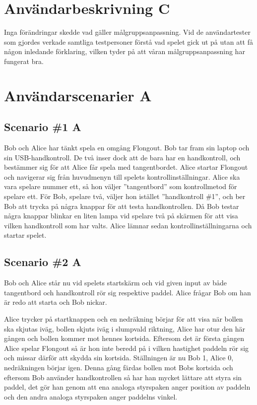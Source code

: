 \documentclass[a4paper,11pt]{article}
\begin{document}
\section{Användarbeskrivning C}
Inga förändringar skedde vad gäller målgruppsanpassning. Vid de användartester som gjordes verkade
samtliga testpersoner förstå vad spelet gick ut på utan att få någon inledande förklaring, vilken
tyder på att våran målgruppsanpassning har fungerat bra.

\section{Användarscenarier A}
\subsection{Scenario \#1 A}
Bob och Alice har tänkt spela en omgång Flongout. Bob tar fram sin laptop
och sin USB-handkontroll. De två inser dock att de bara har en handkontroll,
och bestämmer sig för att Alice får spela med tangentbordet. Alice startar
Flongout och navigerar sig från huvudmenyn till spelets kontrollinställningar.
Alice ska vara spelare nummer ett, så hon väljer ''tangentbord'' som kontrollmetod
för spelare ett. För Bob, spelare två, väljer hon istället ''handkontroll \#1'', och
ber Bob att trycka på några knappar för att testa handkontrollen. Då Bob testar
några knappar blinkar en liten lampa vid spelare två på skärmen för att visa
vilken handkontroll som har valts. Alice lämnar sedan kontrollinställningarna
och startar spelet.

\subsection{Scenario \#2 A}
Bob och Alice står nu vid spelets startskärm och vid given input av både tangentbord och handkontroll
rör sig respektive paddel. Alice frågar Bob om han är redo att starta och Bob nickar.

Alice trycker på startknappen och en nedräkning börjar för att visa när bollen ska skjutas iväg, bollen skjuts iväg i slumpvald riktning, Alice har otur den här gången och bollen kommer mot hennes kortsida.
Eftersom det är första gången Alice spelar Flongout så är hon inte beredd på i vilken hastighet paddeln rör sig och missar därför att skydda sin kortsida.
Ställningen är nu Bob 1, Alice 0, nedräkningen börjar igen.
Denna gång färdas bollen mot Bobs kortsida och eftersom Bob använder handkontrollen så har han mycket lättare att styra sin paddel,
det gör han genom att ena analoga styrspaken anger position av paddeln och den andra analoga styrspaken anger paddelns vinkel.
\end{document}
